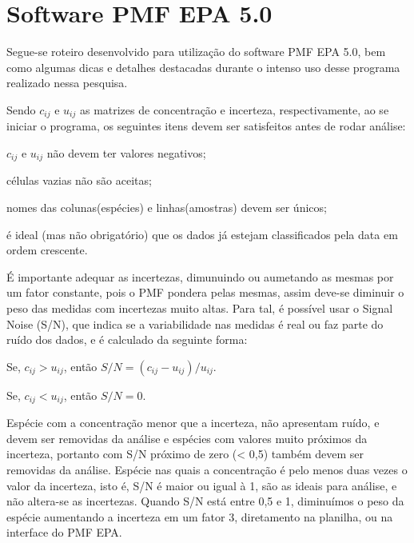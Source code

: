 \section{Software PMF EPA 5.0}

Segue-se roteiro desenvolvido para utilização do software PMF EPA 5.0, 
bem como algumas dicas e detalhes destacadas durante o intenso uso desse 
programa realizado nessa pesquisa.  

Sendo $c_{ij}$ e $u_{ij}$ as matrizes de concentração e incerteza, 
respectivamente, ao se iniciar o programa, os seguintes itens devem ser 
satisfeitos antes de rodar análise:

\begin{itemize}
  \begin{spacing}{1.0}
  \item $c_{ij}$ e $u_{ij}$ não devem ter valores negativos;
  \item células vazias não são aceitas;
  \item nomes das colunas(espécies) e linhas(amostras) devem ser únicos;
  \item é ideal (mas não obrigatório) que os dados já estejam classificados 
        pela data em ordem crescente.
  \end{spacing}
\end{itemize}

É importante adequar as incertezas, dimunuindo ou aumetando as mesmas por um 
fator constante, pois o PMF pondera pelas mesmas, assim deve-se diminuir o peso
das medidas com incertezas muito altas. Para tal, é possível usar o 
Signal Noise (S/N), que indica se a variabilidade nas medidas é real ou faz 
parte do ruído dos dados, e é calculado da seguinte forma: 

\begin{itemize}
  \begin{spacing}{1.0}
    \item Se, $c_{ij} >  u_{ij}$, então $ S/N = (c_{ij} - u_{ij})/u_{ij}$.
    \item Se, $c_{ij} <  u_{ij}$, então $ S/N = 0 $.
  \end{spacing}
\end{itemize}

Espécie com a concentração menor que a incerteza, não apresentam ruído, e devem 
ser removidas da análise e espécies com valores muito próximos da incerteza, 
portanto com S/N próximo de zero (< 0,5) também devem ser removidas da 
análise. Espécie nas quais a concentração é pelo menos duas vezes o valor da 
incerteza, isto é, S/N é maior ou igual à 1, são as ideais para análise, 
e não altera-se as incertezas.
Quando S/N está entre 0,5 e 1, diminuímos o peso da espécie aumentando a 
incerteza em um fator 3, diretamento na planilha, ou na interface do PMF EPA.   

